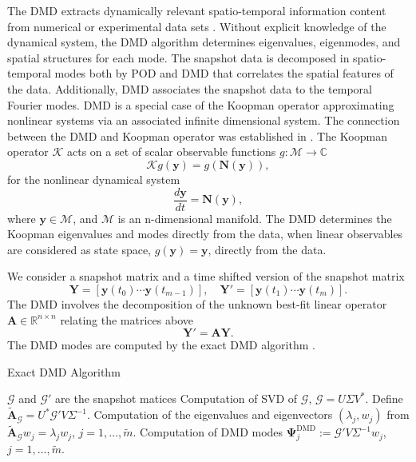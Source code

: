 \documentclass[preprint,12pt]{elsarticle}
\begin{document}
The DMD extracts dynamically relevant spatio-temporal information content from  numerical or experimental data sets \cite{Kutz16}.  Without explicit knowledge of the dynamical system, the DMD algorithm determines eigenvalues, eigenmodes, and spatial structures for each mode.  The snapshot data
is decomposed in spatio-temporal modes both by POD and DMD that correlates the spatial features of the data. Additionally, DMD
associates the snapshot data to the  temporal Fourier modes.
DMD is a special case of the Koopman operator  \cite{Koopman31} approximating nonlinear systems via an associated infinite dimensional system. The connection between the DMD and Koopman operator was  established  in \cite{Rowley12,Schmid10dmd} . The Koopman operator ${\mathcal K}$ acts on a set of scalar observable functions $g:{\mathcal M} \rightarrow {\mathbb C}$
\begin{equation*}
{\mathcal K} g({\bm y}) = g({\bm N}({\bm y})) ,
\end{equation*}
for the nonlinear dynamical system
\begin{equation*}
\frac{d{\bm y}}{dt} = {\bm N}({\bm y}),
\end{equation*}
where ${\bm y}\in {\mathcal M}$, and ${\mathcal M}$ is an n-dimensional manifold. The DMD determines the Koopman eigenvalues and  modes directly from the data, when linear observables are considered as state space, $g({\bm y}) = {\bm y}$, directly from the data.


We consider a snapshot matrix and a time shifted version of the snapshot matrix
\begin{equation}\label{dmdsnap}
{\bm Y}= [ {\bm y}(t_0) \cdots  {\bm y}(t_{m-1}) ], \quad
{\bm Y}'= [ {\bm y}(t_1)  \cdots  {\bm y}(t_m) ].
\end{equation}
The DMD involves the decomposition of the unknown best-fit linear operator ${\mathbf A}\in \mathbb{R}^{n \times n}$ relating the matrices above
\begin{equation*}
{\mathbf Y}' = {\mathbf A} {\mathbf Y}.
\end{equation*}
The DMD modes are computed by the exact DMD algorithm \cite{Tu14}.


\begin{algorithm}[t]
 \caption{Exact DMD Algorithm\label{exactDMD_alg}}
 \begin{algorithmic}
 \STATE ${\mathcal G }$ and ${\mathcal G }'$ are the snapshot matices
 \STATE Computation of  SVD of ${\mathcal G }$,  ${\mathcal G } = U\Sigma V^{*}$.
 \STATE Define $\tilde{\bm A}_{\mathcal G } = U^{*} {\mathcal G }' V \Sigma^{-1}$.
 \STATE Computation of the eigenvalues and eigenvectors   $(\lambda_j,w_j)$ from $\tilde{\bm A}_{\mathcal G } w_j=  \lambda_jw_j$, $j=1,\ldots ,\widetilde{m}$.
 \STATE Computation of DMD modes $\bm{\Psi}^{\text{DMD}}_j:={\mathcal G }'V\Sigma^{-1}w_j$, $j=1,\ldots, \widetilde{m}$.
 \end{algorithmic}
 \end{algorithm}
\end{document}
